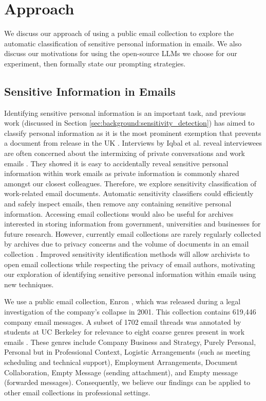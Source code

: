 \section{Approach}
We discuss our approach of using a public email collection to explore the automatic classification of sensitive personal information in emails. We also discuss our motivations for using the open-source LLMs we choose for our experiment, then formally state our prompting strategies.

\subsection{Sensitive Information in Emails}
Identifying sensitive personal information is an important task, and previous work (discussed in Section \ref{sec:background:sensitivity_detection}) has aimed to classify personal information as it is the most prominent exemption that prevents a document from release in the UK \cite{TNA:16}. Interviews by Iqbal et al. reveal interviewees are often concerned about the intermixing of private conversations and work emails \cite{iqbal2021search}. They showed it is easy to accidentally reveal sensitive personal information within work emails as private information is commonly shared amongst our closest colleagues. Therefore, we explore sensitivity classification of work-related email documents. Automatic sensitivity classifiers could efficiently and safely inspect emails, then remove any containing sensitive personal information. Accessing email collections would also be useful for archives interested in storing information from government, universities and businesses for future research. However, currently email collections are rarely regularly collected by archives due to privacy concerns and the volume of documents in an email collection \cite{TFTAEA:18}. Improved sensitivity identification methods will allow archivists to open email collections while respecting the privacy of email authors, motivating our exploration of identifying sensitive personal information within emails using new techniques.

We use a public email collection, Enron \cite{klimt2004enron}, which was released during a legal investigation of the company’s collapse in 2001. This collection contains 619,446 company email messages. A subset of 1702 email threads was annotated by students at UC Berkeley for relevance to eight coarse genres present in work emails \cite{hearst2005teaching}. These genres include Company Business and Strategy, Purely Personal, Personal but in Professional Context, Logistic Arrangements (such as meeting scheduling and technical support), Employment Arrangements, Document Collaboration, Empty Message (sending attachment), and Empty message (forwarded messages). Consequently, we believe our findings can be applied to other email collections in professional settings.

